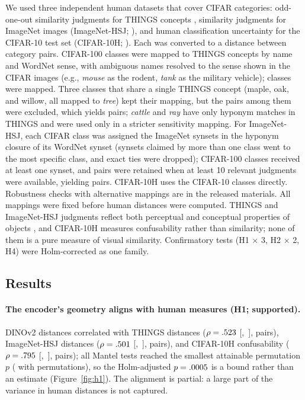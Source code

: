 \documentclass[11pt]{article}
\begin{document}
We used three independent human datasets that cover CIFAR categories: odd-one-out similarity judgments for THINGS concepts \parencite{hebart2020,hebart2023}, similarity judgments for ImageNet images (ImageNet-HSJ; \cite{roads2021}), and human classification uncertainty for the CIFAR-10 test set (CIFAR-10H; \cite{peterson2019}). Each was converted to a distance between category pairs. CIFAR-100 classes were mapped to THINGS concepts by name and WordNet sense, with ambiguous names resolved to the sense shown in the CIFAR images (e.g., \emph{mouse} as the rodent, \emph{tank} as the military vehicle); \MapThingsClasses{} classes were mapped. Three classes that share a single THINGS concept (maple, oak, and willow, all mapped to \emph{tree}) kept their mapping, but the pairs among them were excluded, which yields \CovThingsPairs{} pairs; \emph{cattle} and \emph{ray} have only hyponym matches in THINGS and were used only in a stricter sensitivity mapping. For ImageNet-HSJ, each CIFAR class was assigned the ImageNet synsets in the hyponym closure of its WordNet synset (synsets claimed by more than one class went to the most specific class, and exact ties were dropped); \MapHsjClasses{} CIFAR-100 classes received at least one synset, and pairs were retained when at least 10 relevant judgments were available, yielding \HOneHsjN{} pairs. CIFAR-10H uses the CIFAR-10 classes directly. Robustness checks with alternative mappings are in the released materials. All mappings were fixed before human distances were computed. THINGS and ImageNet-HSJ judgments reflect both perceptual and conceptual properties of objects \parencite{hebart2020}, and CIFAR-10H measures confusability rather than similarity; none of them is a pure measure of visual similarity. Confirmatory tests (H1 $\times$ 3, H2 $\times$ 2, H4) were Holm-corrected as one family.

\subsection{Results}

\paragraph{The encoder's geometry aligns with human measures (H1; supported).} DINOv2 distances correlated with THINGS distances ($\rho = .523$ [\HOneThingsLo,~\HOneThingsHi], \HOneThingsN{} pairs), ImageNet-HSJ distances ($\rho = .501$ [\HOneHsjLo,~\HOneHsjHi], \HOneHsjN{} pairs), and CIFAR-10H confusability ($\rho = .795$ [\HOneCtenLo,~\HOneCtenHi], \HOneCtenN{} pairs); all Mantel tests \parencite{mantel1967} reached the smallest attainable permutation $p$ (\MantelPmin{} with \MantelPerms{} permutations), so the Holm-adjusted $p = .0005$ is a bound rather than an estimate (Figure~\ref{fig:h1}). The alignment is partial: a large part of the variance in human distances is not captured.
\end{document}
